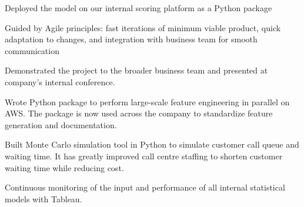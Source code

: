 \begin{cventries}
{\begin{cvitems}
\begin{cvitems}
          \item {Deployed the model on our internal scoring platform as a Python package}
          \item {Guided by Agile principles: fast iterations of minimum viable product, quick adaptation to changes, and integration with business team for smooth communication}
          \item {Demonstrated the project to the broader business team and presented at company's internal conference.}\\
        \end{cvitems}
        \item {Wrote Python package to perform large-scale feature engineering in parallel on AWS. The package is now used across the company to standardize feature generation and documentation.}
        \item {Built Monte Carlo simulation tool in Python to simulate customer call queue and waiting time. It has greatly improved call centre staffing to shorten customer waiting time while reducing cost.}
        \item {Continuous monitoring of the input and performance of all internal statistical models with Tableau.}
      \end{cvitems}
    }

\end{cventries}
